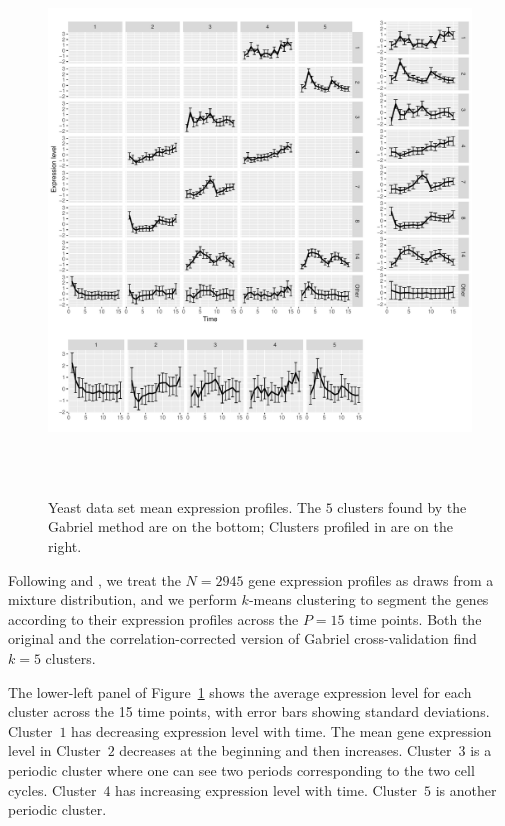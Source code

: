 \documentclass[12pt]{article}
\begin{document}
\begin{figure}
		\centering
	\includegraphics[width=5.7in, height=5.7in]{main_code/data_examples/split_plots.pdf}
	\caption{Yeast data set mean expression profiles. The $5$ clusters found by
  the Gabriel method are on the bottom; Clusters profiled in
  \cite{tavazoie1999systematic} are on the right.}
	\label{fig:5_clusters}
\end{figure}	

Following \citet{tavazoie1999systematic} and \citet{dortet2008model}, we
treat the $N = 2945$ gene expression profiles as draws from a mixture
distribution, and we perform $k$-means clustering to segment the genes
according to their expression profiles across the $P = 15$ time points. 
Both the original and the correlation-corrected version of Gabriel
cross-validation find $k = 5$ clusters.

The lower-left panel of Figure~\ref{fig:5_clusters} shows the average
expression level for each cluster across the 15 time points, with error bars
showing standard deviations. Cluster~$1$ has decreasing expression level with
time. The mean gene expression level in Cluster~$2$ decreases at the beginning
and then increases. Cluster~$3$ is a periodic cluster where one can see two
periods corresponding to the two cell cycles. Cluster~$4$ has increasing
expression level with time.  Cluster~$5$ is another periodic cluster. 
\end{document}
